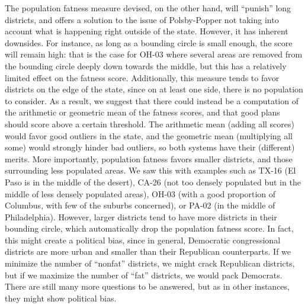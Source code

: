 \documentclass[letterpaper]{article}
\begin{document}
The population fatness measure devised, on the other hand, will “punish” long districts, and offers a solution to the issue of Polsby-Popper not taking into account what is happening right outside of the state. However, it has inherent downsides. For instance, as long as a bounding circle is small enough, the score will remain high: that is the case for OH-03 where several areas are removed from the bounding circle deeply down towards the middle, but this has a relatively limited effect on the fatness score. Additionally, this measure tends to favor districts on the edge of the state, since on at least one side, there is no population to consider. As a result, we suggest that there could instead be a computation of the arithmetic or geometric mean of the fatness scores, and that good plans should score above a certain threshold. The arithmetic mean (adding all scores) would favor good outliers in the state, and the geometric mean (multiplying all some) would strongly hinder bad outliers, so both systems have their (different) merits. More importantly, population fatness favors smaller districts, and those surrounding less populated areas. We saw this with examples such as TX-16 (El Paso is in the middle of the desert), CA-26 (not too densely populated but in the middle of less densely populated areas), OH-03 (with a good proportion of Columbus, with few of the suburbs concerned), or PA-02 (in the middle of Philadelphia). However, larger districts tend to have more districts in their bounding circle, which automatically drop the population fatness score. In fact, this might create a political bias, since in general, Democratic congressional districts are more urban and smaller than their Republican counterparts. If we minimize the number of “nonfat” districts, we might crack Republican districts, but if we maximize the number of “fat” districts, we would pack Democrats. There are still many more questions to be answered, but as in other instances, they might show political bias. 




\end{document}
